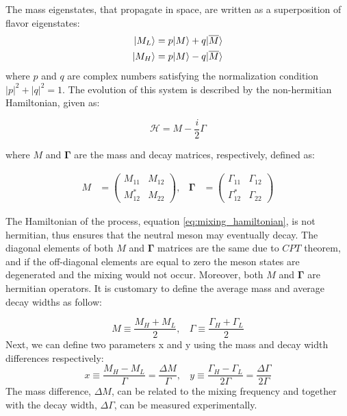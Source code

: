 The mass eigenstates, that propagate in space, are written as a superposition of flavor eigenstates:
\begin{equation}
    \begin{split}
        \lvert M_L\rangle = p \lvert M\rangle + q \lvert\overline{M}\rangle \\
        \lvert M_H\rangle = p \lvert M\rangle - q \lvert\overline{M}\rangle \\
    \end{split}
\end{equation}
 where $p$ and $q$ are complex numbers satisfying the normalization condition $|p|^{2}+|q|^{2} = 1$. 
 The evolution of this system is described by the non-hermitian Hamiltonian, given as:

\begin{equation}
\label{eq:mixing_hamiltonian}
    \mathcal{H}  = M - \frac{i}{2} \Gamma
\end{equation}

where $M$ and $\bm{\Gamma}$ are the mass and decay matrices, respectively, defined as:

\begin{align}
    M &= \left( \begin{matrix} M_{11} & M_{12}  \\ M_{12}^{*} & M_{22} \end{matrix} \right), & 
    \bm{\Gamma} &=  \left( \begin{matrix} \Gamma_{11} & \Gamma_{12}  \\ \Gamma_{12}^{*} & \Gamma_{22} \end{matrix} \right) 
\end{align}

The Hamiltonian of the process, equation \ref{eq:mixing_hamiltonian}, is not hermitian, thus ensures that the neutral meson may eventually decay. The diagonal elements of both $M$ and $\bm{\Gamma}$ matrices are the same due to $CPT$  theorem, and if the off-diagonal elements are equal to zero the meson states are degenerated and the mixing would not occur. Moreover, both  $M$ and $\bm{\Gamma}$ are hermitian operators. It is customary to define the average mass and average decay widths as follow:

\begin{equation}
\label{eq:mass_gamma}
    M \equiv \frac{M_{H} + M_{L}}{2}, ~~~~
    \Gamma \equiv \frac{\Gamma_{H} + \Gamma_{L}}{2}
\end{equation}
Next, we can define two parameters x and y using the mass and decay width differences respectively:
\begin{equation}
\label{eq:x_y}
    x \equiv \frac{M_{H} - M_{L}}{\Gamma} = \frac{\Delta M}{\Gamma}, ~~~~
    y \equiv \frac{\Gamma_{H} - \Gamma_{L}}{2 \Gamma} = \frac{\Delta \Gamma}{2 \Gamma}
\end{equation}
The mass difference, $\Delta M$, can be related to the mixing frequency and together with the decay width, $\Delta \Gamma$, can be measured experimentally.

